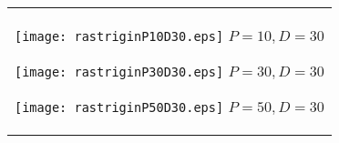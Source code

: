 \documentclass[a4paper,11pt,oneside,openany]{jsbook}
\begin{document}
\begin{figure}[htbp]
  \begin{center}
    \begin{tabular}{c}


      \begin{minipage}{0.33\hsize}
        \begin{center}
          \texttt{[image: rastriginP10D30.eps]}
          \hspace{1.2cm}$P=10, D=30
$        \end{center}
      \end{minipage}

      \begin{minipage}{0.33\hsize}
        \begin{center}
          \texttt{[image: rastriginP30D30.eps]}
          \hspace{1.2cm}$P=30, D=30
$        \end{center}
      \end{minipage}

      \begin{minipage}{0.33\hsize}
        \begin{center}
          \texttt{[image: rastriginP50D30.eps]}
          \hspace{1.2cm}$P=50, D=30
$        \end{center}
      \end{minipage}
    \end{tabular}
  \end{center}
\end{figure}
\end{document}

